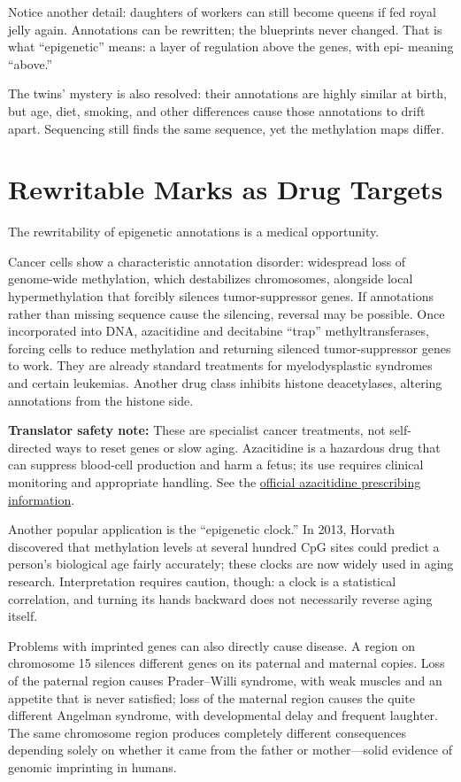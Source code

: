 Notice another detail: daughters of workers can still become queens if fed royal jelly again. Annotations can be rewritten; the blueprints never changed. That is what ``epigenetic'' means: a layer of regulation above the genes, with epi- meaning ``above.''

The twins' mystery is also resolved: their annotations are highly similar at birth, but age, diet, smoking, and other differences cause those annotations to drift apart. Sequencing still finds the same sequence, yet the methylation maps differ.

\section{Rewritable Marks as Drug Targets}

The rewritability of epigenetic annotations is a medical opportunity.

Cancer cells show a characteristic annotation disorder: widespread loss of genome-wide methylation, which destabilizes chromosomes, alongside local hypermethylation that forcibly silences tumor-suppressor genes. If annotations rather than missing sequence cause the silencing, reversal may be possible. Once incorporated into DNA, azacitidine and decitabine ``trap'' methyltransferases, forcing cells to reduce methylation and returning silenced tumor-suppressor genes to work. They are already standard treatments for myelodysplastic syndromes and certain leukemias. Another drug class inhibits histone deacetylases, altering annotations from the histone side.

\textbf{Translator safety note:} These are specialist cancer treatments, not self-directed ways to reset genes or slow aging. Azacitidine is a hazardous drug that can suppress blood-cell production and harm a fetus; its use requires clinical monitoring and appropriate handling. See the \href{https://dailymed.nlm.nih.gov/dailymed/fda/fdaDrugXsl.cfm?setid=80a43736-0598-4e4b-85ba-e29daa290c8f\&type=display}{official azacitidine prescribing information}.

Another popular application is the ``epigenetic clock.'' In 2013, Horvath discovered that methylation levels at several hundred CpG sites could predict a person's biological age fairly accurately; these clocks are now widely used in aging research. Interpretation requires caution, though: a clock is a statistical correlation, and turning its hands backward does not necessarily reverse aging itself.

Problems with imprinted genes can also directly cause disease. A region on chromosome 15 silences different genes on its paternal and maternal copies. Loss of the paternal region causes Prader--Willi syndrome, with weak muscles and an appetite that is never satisfied; loss of the maternal region causes the quite different Angelman syndrome, with developmental delay and frequent laughter. The same chromosome region produces completely different consequences depending solely on whether it came from the father or mother---solid evidence of genomic imprinting in humans.

